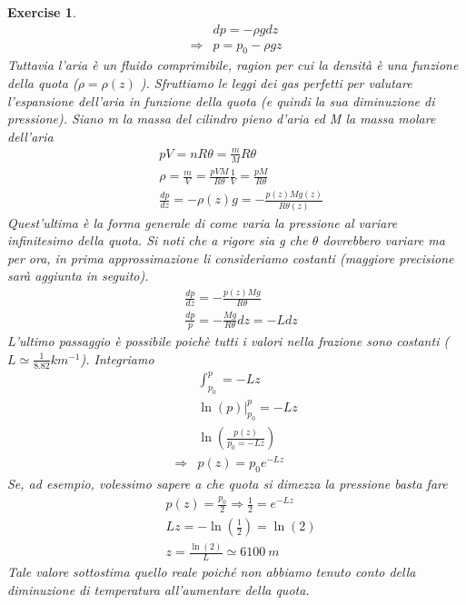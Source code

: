 \documentclass[10pt,a4paper]{article}
\newtheorem{exercise}{Exercise}
\begin{document}
\begin{exercise}
\begin{align*}
	&dp = -\rho  g dz \\
	\Rightarrow & p = p_0 - \rho g z
\end{align*} 
Tuttavia l'aria è un fluido comprimibile, ragion per cui la densità è una funzione della quota ($\rho = \rho(z)$ ). Sfruttiamo le leggi dei gas perfetti per valutare l'espansione dell'aria in funzione della quota (e quindi la sua diminuzione di pressione). Siano m la massa del cilindro pieno d'aria ed M la massa molare dell'aria
\begin{align*} 
	&p V = n R \theta = \frac{m}{M} R \theta \\
	&\rho = \frac{m}{V} = \frac{p V M}{R \theta} \frac{1}{V} = \frac{p M}{R \theta}\\
	&\frac{dp}{dz}=-\rho(z) g = - \frac{p(z) M g(z)}{R\theta(z)}
\end{align*} 
Quest'ultima è la forma generale di come varia la pressione al variare infinitesimo della quota. Si noti che a rigore sia g che $\theta$ dovrebbero variare ma per ora, in prima approssimazione li consideriamo costanti (maggiore precisione sarà aggiunta in seguito). 
\begin{align}\label{eq:esercizio_pressione}
	&\frac{dp}{dz}=- \frac{p(z) M g}{R\theta}\nonumber\\
	&\frac{dp}{p} = -\frac{M g}{R \theta} dz = - L dz
\end{align} 
L'ultimo passaggio è possibile poichè tutti i valori nella frazione sono costanti ($ L \simeq \frac{1}{8.82} km^{-1}$). Integriamo
\begin{align*} 
	&\int_{p_0}^{p} = -L z\\
	& \ln(p) \Big|_{p_0}^p = -L z\\
	&\ln\left(\frac{p(z)}{p_0= - L z}\right)\\
	\Rightarrow& p(z) = p_0 e^{-L z}
\end{align*} 
Se, ad esempio, volessimo sapere a che quota si dimezza la pressione basta fare
\begin{align*} 
	&p(z) = \frac{p_0}{2} \Rightarrow \frac{1}{2} = e^{-L z}\\
	&L z = -\ln(\frac{1}{2}) = \ln(2) \\
	&z = \frac{\ln(2)}{L} \simeq 6100\ m
\end{align*} 
Tale valore sottostima quello reale poiché non abbiamo tenuto conto della diminuzione di temperatura all'aumentare della quota.
\end{exercise}
\end{document}

